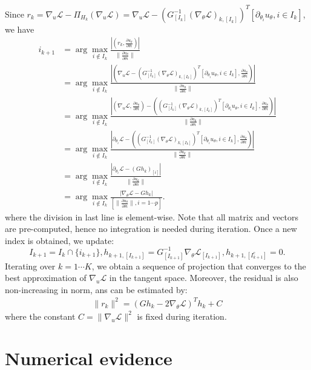 \documentclass{article}
\begin{document}
Since $r_k=\nabla_u\mathcal{L}-\Pi_{H_k}(\nabla_u\mathcal{L})=\nabla_u\mathcal{L}-(G_{[I_k]}^{-1} (\nabla_\theta\mathcal{L})_{k,[I_k]})^T [\partial_{\theta_i}u_\theta,i\in I_k]$, we have 
\begin{align*}
    i_{k+1}&= \arg\max_{i\notin I_k} \frac{|(r_k,\frac{\partial u_\theta}{\partial\theta i})|}{\|\frac{\partial u_\theta}{\partial\theta i}\|} \\ 
    &=\arg\max_{i\notin I_k} \frac{|(\nabla_u\mathcal{L}-(G_{[I_k]}^{-1} (\nabla_\theta\mathcal{L})_{k,[I_k]})^T [\partial_{\theta_i}u_\theta,i\in I_k],\frac{\partial u_\theta}{\partial\theta i})|}{\|\frac{\partial u_\theta}{\partial\theta i}\|}  \\ 
    &= \arg\max_{i\notin I_k} \frac{|(\nabla_u\mathcal{L},\frac{\partial u_\theta}{\partial\theta i})-((G_{[I_k]}^{-1} (\nabla_\theta\mathcal{L})_{k,[I_k]})^T [\partial_{\theta_i}u_\theta,i\in I_k],\frac{\partial u_\theta}{\partial\theta i})|}{\|\frac{\partial u_\theta}{\partial\theta i}\|} \\ 
    &= \arg\max_{i\notin I_k} \frac{|\partial_{\theta_i}\mathcal{L}-((G_{[I_k]}^{-1} (\nabla_\theta \mathcal{L})_{k,[I_k]})^T [\partial_{\theta_i}u_\theta,i\in I_k],\frac{\partial u_\theta}{\partial\theta i})|}{\|\frac{\partial u_\theta}{\partial\theta i}\|} \\ 
    &= \arg\max_{i\notin I_k} \frac{|\partial_{\theta_i}\mathcal{L}-(Gh_k)_{[i]}|}{\|\frac{\partial u_\theta}{\partial\theta i}\|} \\ 
    &= \arg\max_{i\notin I_k} \frac{|\nabla_{\theta}\mathcal{L}-Gh_k|}{[\|\frac{\partial u_\theta}{\partial\theta i}\|,i=1\cdots p]}.
\end{align*}
where the division in last line is element-wise. Note that all matrix and vectors are pre-computed, hence no integration is needed during iteration. Once a new index is obtained, we update:
\[
    I_{k+1}=I_{k}\cap\{i_{k+1}\}, h_{k+1,[I_{k+1}]}=G^{-1}_{[I_{k+1}]}\nabla_\theta\mathcal{L}_{[I_{k+1}]}, h_{k+1,[I_{k+1}^c]}=0.
\]
Iterating over $k=1\cdots K$, we obtain a sequence of projection that converges to the best approximation of $\nabla_u\mathcal{L}$ in the tangent space. Moreover, the residual is also non-increasing in norm, ans can be estimated by:
\begin{align*}
    \|r_k\|^2 = (Gh_k-2\nabla_\theta\mathcal{L})^T h_k + C
\end{align*}
where the constant $C=\|\nabla_u\mathcal{L}\|^2$ is fixed during iteration.

\section{Numerical evidence}
\end{document}
